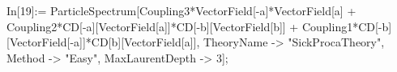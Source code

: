 In[19]:= ParticleSpectrum[Coupling3*VectorField[-a]*VectorField[a] + Coupling2*CD[-a][VectorField[a]]*CD[-b][VectorField[b]] + Coupling1*CD[-b][VectorField[-a]]*CD[b][VectorField[a]], TheoryName -> "SickProcaTheory", Method -> "Easy", MaxLaurentDepth -> 3]; 